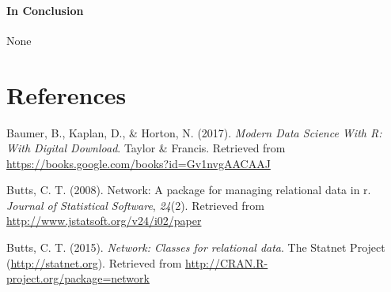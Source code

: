 \documentclass[12pt,twoside]{amherstthesis}
\begin{document}
  \begin{Shaded}
  \begin{Highlighting}[]
  \StringTok{ }\StringTok{ }
  
  \NormalTok{(}\NormalTok{)}
  \StringTok{ }\NormalTok{)}
  
  
  
  \StringTok{ }\StringTok{ }
  
  \NormalTok{(}\NormalTok{)}
  \StringTok{ }\NormalTok{)}
  \end{Highlighting}
  \end{Shaded}
  
  \subsubsection{In Conclusion}\label{in-conclusion}
  
  None
  
  \backmatter
  
  \chapter{References}\label{references}
  
  \noindent
  
  \setlength{\parindent}{-0.20in} \setlength{\leftskip}{0.20in}
  \setlength{\parskip}{8pt}
  
  \hypertarget{refs}{}
  \hypertarget{ref-baumer_modern_2017}{}
  Baumer, B., Kaplan, D., \& Horton, N. (2017). \emph{Modern Data Science
  With R: With Digital Download}. Taylor \& Francis. Retrieved from
  \url{https://books.google.com/books?id=Gv1nvgAACAAJ}
  
  \hypertarget{ref-networkpackagearticle}{}
  Butts, C. T. (2008). Network: A package for managing relational data in
  r. \emph{Journal of Statistical Software}, \emph{24}(2). Retrieved from
  \url{http://www.jstatsoft.org/v24/i02/paper}
  
  \hypertarget{ref-networkpackagemanual}{}
  Butts, C. T. (2015). \emph{Network: Classes for relational data}. The
  Statnet Project (\url{http://statnet.org}). Retrieved from
  \url{http://CRAN.R-project.org/package=network}
  
\end{document}
